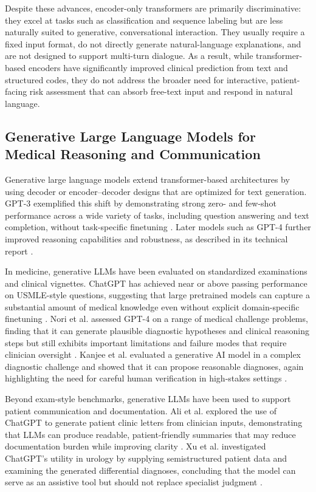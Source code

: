 Despite these advances, encoder-only transformers are primarily discriminative: they excel at tasks such as classification and sequence labeling but are less naturally suited to generative, conversational interaction. They usually require a fixed input format, do not directly generate natural-language explanations, and are not designed to support multi-turn dialogue. As a result, while transformer-based encoders have significantly improved clinical prediction from text and structured codes, they do not address the broader need for interactive, patient-facing risk assessment that can absorb free-text input and respond in natural language.

\subsection{Generative Large Language Models for Medical Reasoning and Communication}

Generative large language models extend transformer-based architectures by using decoder or encoder–decoder designs that are optimized for text generation. GPT-3 exemplified this shift by demonstrating strong zero- and few-shot performance across a wide variety of tasks, including question answering and text completion, without task-specific finetuning \cite{brown2020language}. Later models such as GPT-4 further improved reasoning capabilities and robustness, as described in its technical report \cite{achiam2023gpt}.

In medicine, generative LLMs have been evaluated on standardized examinations and clinical vignettes. ChatGPT has achieved near or above passing performance on USMLE-style questions, suggesting that large pretrained models can capture a substantial amount of medical knowledge even without explicit domain-specific finetuning \cite{kung2023performance,gilson2023chatgpt}. Nori et al. assessed GPT-4 on a range of medical challenge problems, finding that it can generate plausible diagnostic hypotheses and clinical reasoning steps but still exhibits important limitations and failure modes that require clinician oversight \cite{nori2023capabilities}. Kanjee et al. evaluated a generative AI model in a complex diagnostic challenge and showed that it can propose reasonable diagnoses, again highlighting the need for careful human verification in high-stakes settings \cite{kanjee2023accuracy}.

Beyond exam-style benchmarks, generative LLMs have been used to support patient communication and documentation. Ali et al. explored the use of ChatGPT to generate patient clinic letters from clinician inputs, demonstrating that LLMs can produce readable, patient-friendly summaries that may reduce documentation burden while improving clarity \cite{ali2023chatgpt}. Xu et al. investigated ChatGPT’s utility in urology by supplying semistructured patient data and examining the generated differential diagnoses, concluding that the model can serve as an assistive tool but should not replace specialist judgment \cite{xv2023can}.

